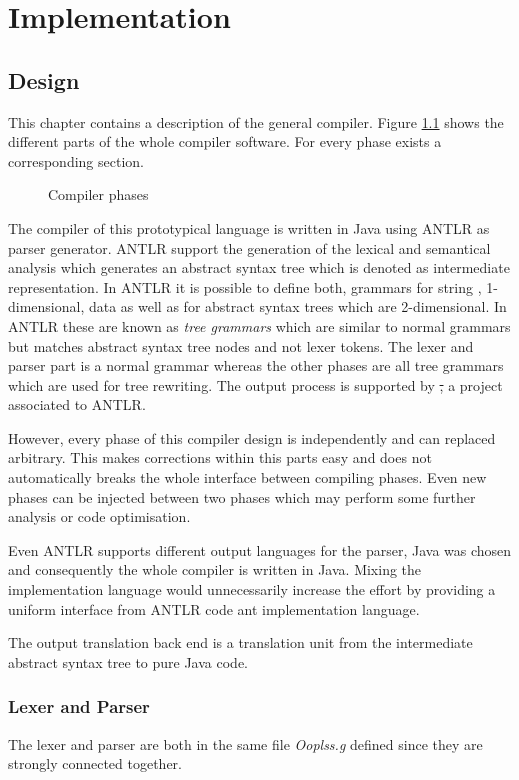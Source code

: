 \chapter{Implementation}
\section{Design}
This chapter contains a description of the general compiler. Figure
\ref{fig:compilerPhase} shows the different parts of the whole compiler
software. For every phase exists a corresponding section.

\begin{figure}[ht]
	\centerline{}
	\caption{Compiler phases}
	\label{fig:compilerPhase}
\end{figure}

The compiler of this prototypical language is written in Java using
ANTLR as parser generator. ANTLR support the generation of the lexical
and semantical analysis which generates an abstract syntax tree which
is denoted as intermediate representation. In ANTLR it is possible to
define both, grammars for string , 1-dimensional, data as well as for
abstract syntax trees which are 2-dimensional. In ANTLR these are known
as \emph{tree grammars} which are similar to normal grammars but matches
abstract syntax tree nodes and not lexer tokens. The lexer and parser
part is a normal grammar whereas the other phases are all tree grammars
which are used for tree rewriting. The output process is supported by
\st, a project associated to ANTLR.

However, every phase of this compiler design is independently and can 
replaced arbitrary. This makes corrections within this parts easy and
does not automatically breaks the whole interface between compiling
phases. Even new phases can be injected between two phases which may 
perform some further analysis or code optimisation.

Even ANTLR supports different output languages for the parser, Java was
chosen and consequently the whole compiler is written in Java. Mixing
the implementation language would unnecessarily increase the effort
by providing a uniform interface from ANTLR code ant implementation
language.

The output translation back end is a translation unit from the
intermediate abstract syntax tree to pure Java code.

\subsection{Lexer and Parser}
The lexer and parser are both in the same file \emph{Ooplss.g} defined
since they are strongly connected together. 

